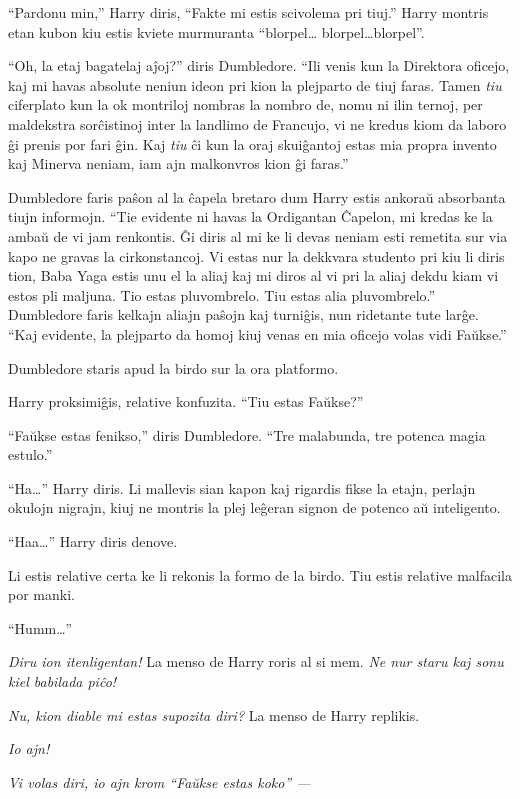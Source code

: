 ``Pardonu min,'' Harry diris, ``Fakte mi estis scivolema pri tiuj.''
Harry montris etan kubon kiu estis kviete murmuranta ``blorpel\ldots
blorpel\ldots blorpel''.

``Oh, la etaj bagatelaj aĵoj?'' diris Dumbledore. ``Ili venis kun la
Direktora oficejo, kaj mi havas absolute neniun ideon pri kion la
plejparto de tiuj faras. Tamen \emph{tiu} ciferplato kun la ok
montriloj nombras la nombro de, nomu ni ilin ternoj, per maldekstra
sorĉistinoj inter la landlimo de Francujo, vi ne kredus kiom da laboro
ĝi prenis por fari ĝin. Kaj \emph{tiu} ĉi kun la oraj skuiĝantoj estas
mia propra invento kaj Minerva neniam, iam ajn malkonvros
kion ĝi faras.''

Dumbledore faris paŝon al la ĉapela bretaro dum Harry estis ankoraŭ
absorbanta tiujn informojn. ``Tie evidente ni havas la Ordigantan
Ĉapelon, mi kredas ke la ambaŭ de vi jam renkontis. Ĝi diris al mi ke
li devas neniam esti remetita sur via kapo ne gravas la
cirkonstancoj. Vi estas nur la dekkvara studento pri kiu li diris
tion, Baba Yaga estis unu el la aliaj kaj mi diros al vi pri la aliaj
dekdu kiam vi estos pli maljuna. Tio estas pluvombrelo. Tiu estas alia
pluvombrelo.'' Dumbledore faris kelkajn aliajn paŝojn kaj turniĝis,
nun ridetante tute larĝe. ``Kaj evidente, la plejparto da homoj kiuj
venas en mia oficejo volas vidi Faŭkse.''

Dumbledore staris apud la birdo sur la ora platformo.

Harry proksimiĝis, relative konfuzita. ``Tiu estas Faŭkse?''

``Faŭkse estas fenikso,'' diris Dumbledore. ``Tre malabunda, tre
potenca magia estulo.''


``Ha\ldots'' Harry diris. Li mallevis sian kapon kaj rigardis fikse la
etajn, perlajn okulojn nigrajn, kiuj ne montris la plej leĝeran signon
de potenco aŭ inteligento.

``Haa\ldots'' Harry diris denove.

Li estis relative certa ke li rekonis la formo de la birdo. Tiu estis relative malfacila por manki.

``Humm\ldots''

\emph{Diru ion itenligentan!} La menso de Harry roris al si
mem. \emph{Ne nur staru kaj sonu kiel babilada piĉo!}

\emph{Nu, kion diable mi estas supozita diri?} La menso de Harry replikis.

\emph{Io ajn!}

\emph{Vi volas diri, io ajn krom ``Faŭkse estas koko'' —}


